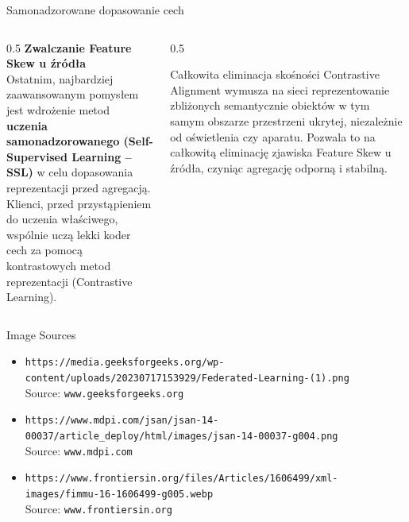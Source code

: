 \documentclass[9pt,aspectratio=169]{beamer}
\begin{document}
{
\begin{frame}{Samonadzorowane dopasowanie cech}
\begin{columns}[T]
\begin{column}{0.5\textwidth}
\textbf{Zwalczanie Feature Skew u źródła}\\[4pt]
Ostatnim, najbardziej zaawansowanym pomysłem jest wdrożenie metod \textbf{uczenia samonadzorowanego (Self-Supervised Learning -- SSL)} w celu dopasowania reprezentacji przed agregacją.\\[6pt]
Klienci, przed przystąpieniem do uczenia właściwego, wspólnie uczą lekki koder cech za pomocą kontrastowych metod reprezentacji (Contrastive Learning).
\end{column}
\begin{column}{0.5\textwidth}
\begin{infoboxgreen}{Całkowita eliminacja skośności}
Contrastive Alignment wymusza na sieci reprezentowanie zbliżonych semantycznie obiektów w tym samym obszarze przestrzeni ukrytej, niezależnie od oświetlenia czy aparatu. Pozwala to na całkowitą eliminację zjawiska Feature Skew u źródła, czyniąc agregację odporną i stabilną.
\end{infoboxgreen}
\end{column}
\end{columns}
\end{frame}
}

{
\begin{frame}{Image Sources}
\footnotesize
\begin{itemize}
\item \texttt{https://media.geeksforgeeks.org/wp-content/uploads/20230717153929/Federated-Learning-(1).png}\\ Source: \texttt{www.geeksforgeeks.org}
\vspace{4pt}
\item \texttt{https://www.mdpi.com/jsan/jsan-14-00037/article\_deploy/html/images/jsan-14-00037-g004.png}\\ Source: \texttt{www.mdpi.com}
\vspace{4pt}
\item \texttt{https://www.frontiersin.org/files/Articles/1606499/xml-images/fimmu-16-1606499-g005.webp}\\ Source: \texttt{www.frontiersin.org}
\end{itemize}
\end{frame}
}
\end{document}
